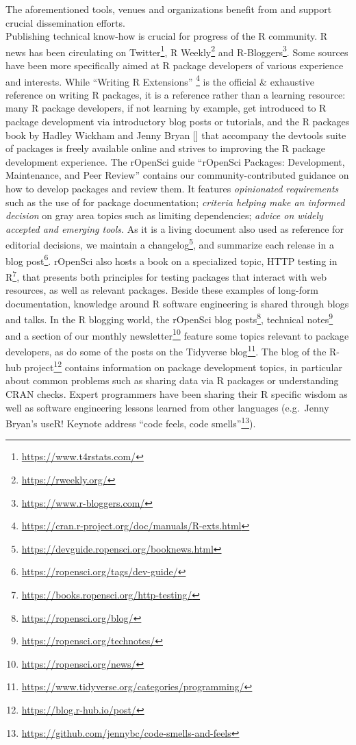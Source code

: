 The aforementioned tools, venues and organizations benefit from and
support crucial dissemination efforts.\\
Publishing technical know-how is crucial for progress of the R
community. R news has been circulating on Twitter\footnote{\url{https://www.t4rstats.com/}},
R Weekly\footnote{\url{https://rweekly.org/}} and R-Bloggers\footnote{\url{https://www.r-bloggers.com/}}.
Some sources have been more specifically aimed at R package developers
of various experience and interests. While ``Writing R Extensions''
\footnote{\url{https://cran.r-project.org/doc/manuals/R-exts.html}} is
the official \& exhaustive reference on writing R packages, it is a
reference rather than a learning resource: many R package developers, if
not learning by example, get introduced to R package development via
introductory blog posts or tutorials, and the R packages book by Hadley
Wickham and Jenny Bryan {[}\citet{rpkgs}{]}\citep{rpkgs2} that accompany
the devtools suite of packages is freely available online and strives to
improving the R package development experience. The rOpenSci guide
``rOpenSci Packages: Development, Maintenance, and Peer Review''
\citep{devguide} contains our community-contributed guidance on how to
develop packages and review them. It features \emph{opinionated
requirements} such as the use of  \citep{roxygen2} for
package documentation; \emph{criteria helping make an informed decision}
on gray area topics such as limiting dependencies; \emph{advice on
widely accepted and emerging tools}. As it is a living document also
used as reference for editorial decisions, we maintain a
changelog\footnote{\url{https://devguide.ropensci.org/booknews.html}},
and summarize each release in a blog post\footnote{\url{https://ropensci.org/tags/dev-guide/}}.
rOpenSci also hosts a book on a specialized topic, HTTP testing in
R\footnote{\url{https://books.ropensci.org/http-testing/}}, that
presents both principles for testing packages that interact with web
resources, as well as relevant packages. Beside these examples of
long-form documentation, knowledge around R software engineering is
shared through blogs and talks. In the R blogging world, the rOpenSci
blog posts\footnote{\url{https://ropensci.org/blog/}}, technical
notes\footnote{\url{https://ropensci.org/technotes/}} and a section of
our monthly newsletter\footnote{\url{https://ropensci.org/news/}}
feature some topics relevant to package developers, as do some of the
posts on the Tidyverse blog\footnote{\url{https://www.tidyverse.org/categories/programming/}}.
The blog of the R-hub project\footnote{\url{https://blog.r-hub.io/post/}}
contains information on package development topics, in particular about
common problems such as sharing data via R packages or understanding
CRAN checks. Expert programmers have been sharing their R specific
wisdom as well as software engineering lessons learned from other
languages (e.g.~Jenny Bryan's useR! Keynote address ``code feels, code
smells''\footnote{\url{https://github.com/jennybc/code-smells-and-feels}}).

